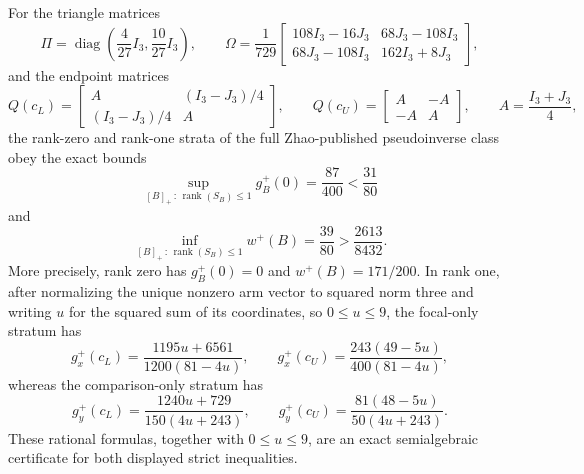 For the triangle matrices
\[
\Pi=\operatorname{diag}\!\left(\frac4{27}I_3,\frac{10}{27}I_3\right),
\qquad
\Omega=\frac1{729}
\begin{bmatrix}
108I_3-16J_3&68J_3-108I_3\\
68J_3-108I_3&162I_3+8J_3
\end{bmatrix},
\]
and the endpoint matrices
\[
Q(c_L)=
\begin{bmatrix}A&(I_3-J_3)/4\\(I_3-J_3)/4&A\end{bmatrix},
\qquad
Q(c_U)=
\begin{bmatrix}A&-A\\-A&A\end{bmatrix},
\qquad A=\frac{I_3+J_3}{4},
\]
the rank-zero and rank-one strata of the full Zhao-published pseudoinverse class obey the exact bounds
\[
\sup_{[B]_+\,:\,\operatorname{rank}(S_B)\le1}g_B^+(0)
=\frac{87}{400}<\frac{31}{80}
\]
and
\[
\inf_{[B]_+\,:\,\operatorname{rank}(S_B)\le1}w^+(B)
=\frac{39}{80}>\frac{2613}{8432}.
\]
More precisely, rank zero has \(g_B^+(0)=0\) and \(w^+(B)=171/200\).  In rank one, after normalizing the unique nonzero arm vector to squared norm three and writing \(u\) for the squared sum of its coordinates, so \(0\le u\le9\), the focal-only stratum has
\[
g_x^+(c_L)=\frac{1195u+6561}{1200(81-4u)},
\qquad g_x^+(c_U)=\frac{243(49-5u)}{400(81-4u)},
\]
whereas the comparison-only stratum has
\[
g_y^+(c_L)=\frac{1240u+729}{150(4u+243)},
\qquad g_y^+(c_U)=\frac{81(48-5u)}{50(4u+243)}.
\]
These rational formulas, together with \(0\le u\le9\), are an exact semialgebraic certificate for both displayed strict inequalities.